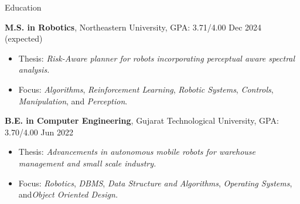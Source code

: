 \documentclass{resume}
\newcommand{\smallspace}{\hspace{0.2em}}
\begin{document}
\fancyheadoffset[RO]{5em}
\fancyfootoffset[RO]{0cm}
\thispagestyle{firstpage}

\begin{rSection}{Education}


{\textbf {M.S. in Robotics}}, Northeastern University, GPA: 3.71/4.00 \hfill {Dec 2024 (expected)} 
 
\begin{itemize}
  \item[] \vspace{-0.5em} \hspace{-1.0em} Thesis: \emph{Risk-Aware planner for robots incorporating perceptual aware spectral analysis.}
  \item[] \vspace{-0.5em} \hspace{-1.0em} Focus: \emph{Algorithms}, \smallspace \emph{Reinforcement Learning}, \smallspace \emph{Robotic Systems}, \smallspace \emph{Controls}, \smallspace \emph{Manipulation}, \smallspace and \smallspace \emph{Perception}.
\end{itemize}


{\bf B.E. in Computer Engineering}, Gujarat Technological University, GPA: 3.70/4.00 \hfill {Jun 2022} 
\begin{itemize}
    \item[] \vspace{-0.5em} \hspace{-1.0em} Thesis: \emph{Advancements in autonomous mobile robots for warehouse management and small scale industry.}
    \item[] \vspace{-0.5em} \hspace{-1.0em} Focus: \emph{Robotics}, \smallspace \emph{DBMS}, \smallspace \emph{Data Structure and Algorithms}, \smallspace \emph{Operating Systems}, \smallspace and\smallspace \emph{Object Oriented Design.}
\end{itemize}
\end{rSection}
\vspace{-3mm}
\end{document}
